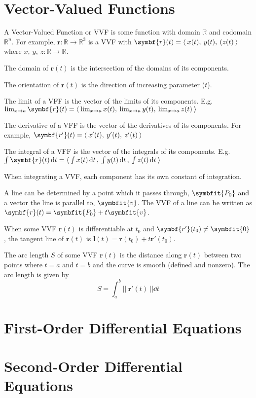 \documentclass{article}
\begin{document}
\section{Vector-Valued Functions}
\begin{definition}
    A Vector-Valued Function or VVF is some function
    with domain $\mathbb{R}$ and codomain $\mathbb{R}^n$.
    For example, $\symbf{r}:\mathbb{R}\to\mathbb{R}^3$
    is a VVF with $\symbf{r}(t)=\avec{x(t),\:y(t),\:(z(t)}$ where
    $x,\:y,\:z: \mathbb{R}\to\mathbb{R}$.
\end{definition}
\begin{theorem}
    The domain of $\symbf{r}(t)$ is the intersection of the domains
    of its components.
\end{theorem}
\begin{definition}[Orientation]
    The orientation of $\symbf{r}(t)$ is the direction of increasing parameter ($t$).
\end{definition}
\begin{theorem}
    The limit of a VFF is the vector of the limits of its components.
    E.g. $\lim_{x\to{}a} \symbf{r}(t)
    = \avec{\lim_{x\to{}a}x(t),\:\lim_{x\to{}a}y(t),\:\lim_{x\to{}a}z(t)}$
\end{theorem}
\begin{theorem}
    The derivative of a VFF is the vector of the derivatives of its components.
    For example, $\symbf{r'}(t) = \avec{x'(t),\:y'(t),\:z'(t)}$
\end{theorem}
\begin{theorem}
    The integral of a VFF is the vector of the integrals of its components.
    E.g. $\int\symbf{r}(t)\dd{t}
    = \avec{\int x(t) \dd{t},\:\int y(t) \dd{t},\:\int z(t) \dd{t}}$
\end{theorem}
\begin{remark}
    When integrating a VVF, each component has its own constant of integration.
\end{remark}
\begin{definition}
    A line can be determined by a point which it passes through, $\symbfit{P_0}$
    and a vector the line is parallel to, $\symbfit{v}$.
    The VVF of a line can be written as $\symbf{r}(t)=\symbfit{P_0}+t\symbfit{v}$.
\end{definition}
\begin{definition}
    When some VVF $\symbf{r}(t)$ is differentiable at
    $t_0$ and $\symbf{r'}(t_0)\ne\symbfit{0}$, the tangent line of $\symbf{r}(t)$
    is $\symbf{l}(t) = \symbf{r}(t_0)+t\symbf{r'}(t_0)$.
\end{definition}
\begin{definition}
    The arc length $S$ of some VVF $\symbf{r}(t)$ is the distance along $\symbf{r}(t)$
    between two points where $t=a$ and $t=b$ and the curve is smooth (defined and nonzero).
    The arc length is given by
    \[ S = \int_a^b||\:\symbf{r'}(t)\:||\dd{t} \]
\end{definition}
\newpage
\section{First-Order Differential Equations}
\newpage
\section{Second-Order Differential Equations}
\newpage
\end{document}
